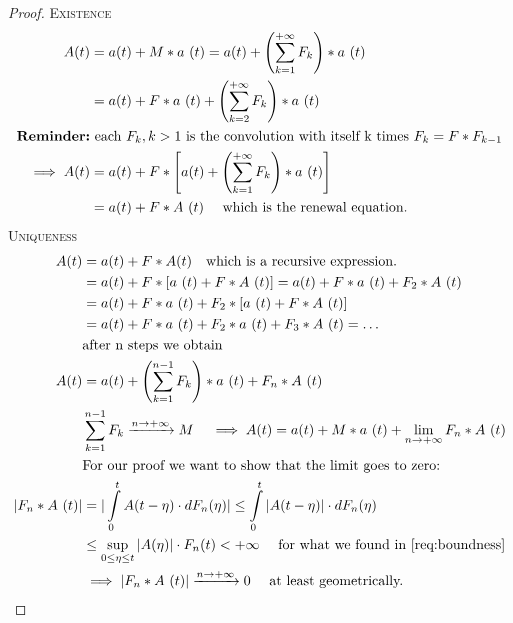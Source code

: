 \begin{proof}
  \proofpart
  \textsc{Existence}
    \begin{equation}\begin{split}
      A(t) &= a(t) + M \ast a~(t) = a(t) + \left(\sum\limits_{k=1}^{+\infty} F_k \right) \ast a~(t) \\
      &= a(t) + F \ast a~(t) +\left(\sum\limits_{k=2}^{+\infty} F_k \right) \ast a~(t)\\
      \text{\textbf{Reminder:}}&\text{ each $F_k , k>1$ is the convolution with itself k times $F_k = F \ast F_{k-1}$} \\
      \implies A(t) &= a(t) + F \ast \left[ a(t) + \left(\sum\limits_{k=1}^{+\infty} F_k \right) \ast a~(t) \right] \\
      &=a(t) + F \ast A ~ (t) \quad \text{ which is the renewal equation.}
    \end{split}\end{equation}
  \proofpart
  \textsc{Uniqueness}
  \begin{equation}\begin{split}
    A(t) &= a(t) + F \ast A(t) \quad \text{which is a recursive expression.} \\
    &= a(t) + F \ast \left[a~(t) + F \ast A~(t) \right] = a(t) + F \ast a ~ (t) + F_2 \ast A~(t) \\
    &= a(t) + F \ast a ~ (t) + F_2 \ast  \left[a~(t) + F \ast A~(t) \right] \\
    &= a(t) + F \ast a~(t) + F_2 \ast a~(t) + F_3 \ast A~(t) = \dots \\
    &\text{after n steps we obtain} \\
    A(t) &= a(t) + \left( \sum\limits_{k=1}^{n-1}F_k\right) \ast a~(t) + F_n \ast A~(t) \\
    & \sum\limits_{k=1}^{n-1}F_k \xrightarrow{n \to +\infty} M \quad \implies A(t) = a(t) + M \ast a~(t) + \lim_{n \to +\infty} F_n \ast A~(t) \\
    &\text{For our proof we want to show that the limit goes to zero:} \\
    |F_n \ast A~(t)| &= |\int\limits_0^{t}A(t-\eta) \cdot dF_n(\eta)| \le \int\limits_0^{t}|A(t-\eta)| \cdot dF_n(\eta)  \\
    & \le \sup\limits_{0 \le \eta \le t} |A(\eta)| \cdot F_n (t) < +\infty \quad \text{ for what we found in \ref{req:boundness}} \\
    &\implies |F_n \ast A~(t)| \xrightarrow{n \to +\infty} 0 \quad\text{ at least geometrically.}
  \end{split}\end{equation}
\end{proof}

